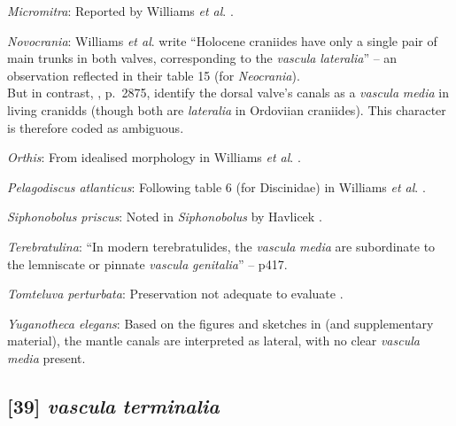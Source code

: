 \documentclass[openany]{book}
\begin{document}
\hypertarget{Micromitra-coding-38}{}
\emph{Micromitra}: Reported by Williams \emph{et al}.
\citeyearpar{Williams1998Thediversity}.

\hypertarget{Novocrania-coding-38}{}
\emph{Novocrania}: Williams \emph{et al}.
\citeyearpar{Williams2000LinguliformeaCraniiformea} write ``Holocene
craniides have only a single pair of main trunks in both valves,
corresponding to the \emph{vascula} \emph{lateralia}'' -- an observation
reflected in their table 15 (for \emph{Neocrania}).\\
But in contrast, \citet{Williams2007Supplement}, p.~2875, identify the
dorsal valve's canals as a \emph{vascula} \emph{media} in living
cranidds (though both are \emph{lateralia} in Ordoviian craniides). This
character is therefore coded as ambiguous.

\hypertarget{Orthis-coding-38}{}
\emph{Orthis}: From idealised morphology in Williams \emph{et al}.
\citeyearpar{Williams2000LinguliformeaCraniiformea}.

\hypertarget{Pelagodiscus_atlanticus-coding-38}{}
\emph{Pelagodiscus atlanticus}: Following table 6 (for Discinidae) in
Williams \emph{et al}.
\citeyearpar{Williams2000LinguliformeaCraniiformea}.

\hypertarget{Siphonobolus_priscus-coding-38}{}
\emph{Siphonobolus priscus}: Noted in \emph{Siphonobolus} by Havlicek
\citeyearpar{Havlicek1982LingulaceaPaterinacea}.

\hypertarget{Terebratulina-coding-38}{}
\emph{Terebratulina}: ``In modern terebratulides, the \emph{vascula}
\emph{media} are subordinate to the lemniscate or pinnate \emph{vascula}
\emph{genitalia}'' -- \citet{Williams1997Introduction} p417.

\hypertarget{Tomteluva_perturbata-coding-38}{}
\emph{Tomteluva perturbata}: Preservation not adequate to evaluate
\citep{Streng2016Anew}.

\hypertarget{Yuganotheca_elegans-coding-38}{}
\emph{Yuganotheca elegans}: Based on the figures and sketches in
\citet{Zhang2014Anearly} (and supplementary material), the mantle canals
are interpreted as lateral, with no clear \emph{vascula} \emph{media}
present.

\subsection*{\texorpdfstring{{[}39{]} \emph{vascula}
\emph{terminalia}}{{[}39{]} vascula terminalia}}\label{vascula-terminalia}
\end{document}
